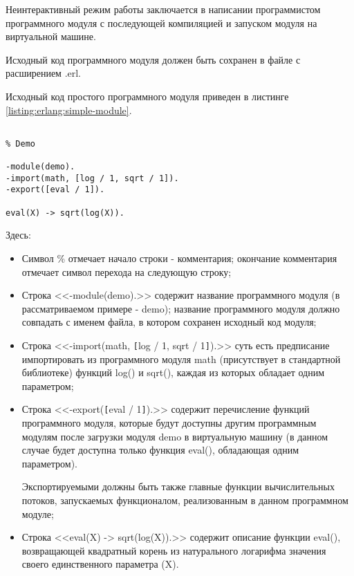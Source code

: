 \begin{itemize}
	Неинтерактивный режим работы заключается в написании программистом программного модуля с последующей компиляцией и запуском модуля на виртуальной машине.

	Исходный код программного модуля должен быть сохранен в файле с расширением .erl.
	
	Исходный код простого программного модуля приведен в листинге \ref{listing:erlang:simple-module}.

\begin{lstlisting}

% Demo

-module(demo).
-import(math, [log / 1, sqrt / 1]).
-export([eval / 1]).

eval(X) -> sqrt(log(X)).

\end{lstlisting}
\mylistingend

	Здесь:

	\begin{itemize}

		\item Символ \% отмечает начало строки - комментария; окончание комментария отмечает символ перехода на следующую строку;
		\item Строка <<-module(demo).>> содержит название программного модуля (в рассматриваемом примере - demo); название программного модуля должно совпадать с именем файла, в котором сохранен исходный код модуля;
		\item Строка <<-import(math, \verb|[|log / 1, sqrt / 1\verb|]|).>> суть есть предписание импортировать из программного модуля math (присутствует в стандартной библиотеке) функций log() и sqrt(), каждая из которых обладает одним параметром;
		\item Строка <<-export(\verb|[|eval / 1\verb|]|).>> содержит перечисление функций программного модуля, которые будут доступны другим программным модулям после загрузки модуля demo в виртуальную машину (в данном случае будет доступна только функция eval(), обладающая одним параметром).

		Экспортируемыми должны быть также главные функции вычислительных потоков, запускаемых функционалом, реализованным в данном программном модуле;

		\item Строка <<eval(X) -> sqrt(log(X)).>> содержит описание функции eval(), возвращающей квадратный корень из натурального логарифма значения своего единственного параметра (X).


\end{itemize}
\end{itemize}

